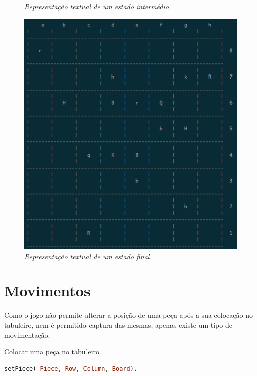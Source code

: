 \documentclass[a4paper]{article}
\begin{document}
\begin{small}
\begin{figure}[!htb]
\caption{\textit{ Representação textual de um estado intermédio.}}
\label{fig:fig6}
\endminipage
\end{figure}
\begin{figure}[!htb]
\begin{center}
\includegraphics[scale=0.3]{board-texto-3.png}
\caption{\textit{ Representação textual de um estado final.}}
\label{fig:fig7}
\endminipage
\end{center}
\end{figure}
\end{small}




\section{Movimentos}

Como o jogo não permite alterar a posição de uma peça após a sua colocação no tabuleiro, nem é permitido captura das mesmas, apenas existe um tipo de movimentação.\linebreak

\Large Colocar uma peça no tabuleiro 
\begin{lstlisting}[language=Prolog]
setPiece( Piece, Row, Column, Board).
\end{lstlisting}
\end{document}
